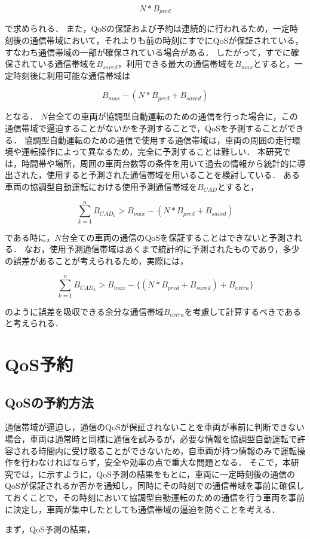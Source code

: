\documentclass[a4paper,11pt,uplatex]{ujreport}
\begin{document}
\begin{equation}
N * B_{pred}
\end{equation}

で求められる．
また，QoSの保証および予約は連続的に行われるため，一定時刻後の通信帯域において，それよりも前の時刻にすでにQoSが保証されている，すなわち通信帯域の一部が確保されている場合がある．
したがって，すでに確保されている通信帯域を$B_{saved}$，利用できる最大の通信帯域を$B_{max}$とすると，一定時刻後に利用可能な通信帯域は

\begin{equation}
B_{max} - (N * B_{pred} + B_{saved})
\end{equation}

となる．
$N$台全ての車両が協調型自動運転のための通信を行った場合に，この通信帯域で逼迫することがないかを予測することで，QoSを予測することができる．
協調型自動運転のための通信で使用する通信帯域は，車両の周囲の走行環境や運転操作によって異なるため，完全に予測することは難しい．
本研究では，時間帯や場所，周囲の車両台数等の条件を用いて過去の情報から統計的に導出された，使用すると予測された通信帯域を用いることを検討している．
ある車両の協調型自動運転における使用予測通信帯域を$B_{CAD}$とすると，

\begin{equation}
\sum_{k=1}^{n} B_{CAD_k} > B_{max} - (N * B_{pred} + B_{saved})
\end{equation}

である時に，$N$台全ての車両の通信のQoSを保証することはできないと予測される．
なお，使用予測通信帯域はあくまで統計的に予測されたものであり，多少の誤差があることが考えられるため，実際には，

\begin{equation}
\sum_{k=1}^{n} B_{CAD_k} > B_{max} - \{(N * B_{pred} + B_{saved}) + B_{extra}\}
\end{equation}

のように誤差を吸収できる余分な通信帯域$B_{extra}$を考慮して計算するべきであると考えられる．

\section{QoS予約}
\label{sec:QoS予約}

\subsection{QoSの予約方法}

通信帯域が逼迫し，通信のQoSが保証されないことを車両が事前に判断できない場合，車両は通常時と同様に通信を試みるが，必要な情報を協調型自動運転で許容される時間内に受け取ることができないため，自車両が持つ情報のみで運転操作を行わなければならず，安全や効率の点で重大な問題となる．
そこで，本研究では，に示すように，QoS予測の結果をもとに，車両に一定時刻後の通信のQoSが保証されるか否かを通知し，同時にその時刻での通信帯域を事前に確保しておくことで，その時刻において協調型自動運転のための通信を行う車両を事前に決定し，車両が集中したとしても通信帯域の逼迫を防ぐことを考える．\par
まず，QoS予測の結果，
\end{document}
